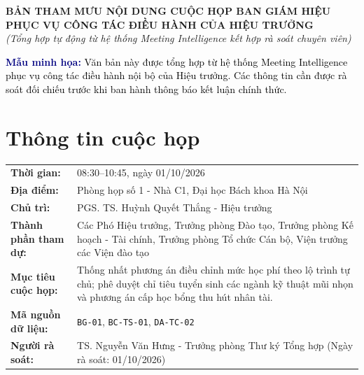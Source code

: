\documentclass[11pt,a4paper]{article}
\newcommand{\notice}[2]{%
  \vspace{4pt}%
  \noindent\colorbox{light}{%
    \parbox{\dimexpr\textwidth-2\fboxsep\relax}{%
      \vspace{2pt}%
      \small\textbf{\textcolor{navy}{#1:}} \textcolor{black}{#2}%
      \vspace{2pt}%
    }%
  }%
  \vspace{4pt}%
}
\begin{document}
\begin{center}
  {\LARGE\bfseries\color{navy} BẢN THAM MƯU NỘI DUNG CUỘC HỌP BAN GIÁM HIỆU}\\[4pt]
  {\large\bfseries\color{muted} PHỤC VỤ CÔNG TÁC ĐIỀU HÀNH CỦA HIỆU TRƯỞNG}\\[2pt]
  {\small\textit{(Tổng hợp tự động từ hệ thống Meeting Intelligence kết hợp rà soát chuyên viên)}}
\end{center}
\vspace{6pt}

\notice{Mẫu minh họa}{Văn bản này được tổng hợp từ hệ thống Meeting Intelligence phục vụ công tác điều hành nội bộ của Hiệu trưởng. Các thông tin cần được rà soát đối chiếu trước khi ban hành thông báo kết luận chính thức.}

\section{Thông tin cuộc họp}

\begin{tabularx}{\textwidth}{@{}>{\bfseries\color{navy}}p{3.8cm} X@{}}
  \toprule
  Thời gian: & 08:30--10:45, ngày 01/10/2026 \\
  Địa điểm: & Phòng họp số 1 - Nhà C1, Đại học Bách khoa Hà Nội \\
  Chủ trì: & PGS. TS. Huỳnh Quyết Thắng - Hiệu trưởng \\
  Thành phần tham dự: & Các Phó Hiệu trưởng, Trưởng phòng Đào tạo, Trưởng phòng Kế hoạch - Tài chính, Trưởng phòng Tổ chức Cán bộ, Viện trưởng các Viện đào tạo \\
  Mục tiêu cuộc họp: & Thống nhất phương án điều chỉnh mức học phí theo lộ trình tự chủ; phê duyệt chỉ tiêu tuyển sinh các ngành kỹ thuật mũi nhọn và phương án cấp học bổng thu hút nhân tài. \\
  Mã nguồn dữ liệu: & \texttt{BG-01}, \texttt{BC-TS-01}, \texttt{DA-TC-02} \\
  Người rà soát: & TS. Nguyễn Văn Hưng - Trưởng phòng Thư ký Tổng hợp (Ngày rà soát: 01/10/2026) \\
  \bottomrule
\end{tabularx}

\end{document}
